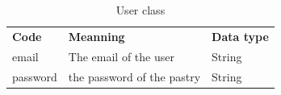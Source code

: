 \documentclass[12pt,a4paper]{report}
\begin{document}
	\begin{table}[H]
		\begin{center}
			\captionsetup[table]{skip=10pt}
			\caption{User class}
			\setlength\doublerulesep{0.5pt}
			
			\begin{tabular}{|  p{5cm}|  p{6cm}|  p{4cm}|}
				\rowcolor{LightCyan}
				
				\hline
				\multicolumn{3}{c}{User class}\\
				\hline 
				\textbf{Code} & \textbf{Meanning} & \textbf{Data type} 
				\\ \hline
				
				email &                        
				The email of the user &                        
				String                     
				
				\\ \hline
				
				password &                        
				the password of the pastry &                        
				String   
				
				\\ \hline
				
			\end{tabular}
			
		\end{center}
	\end{table}
\end{document}
